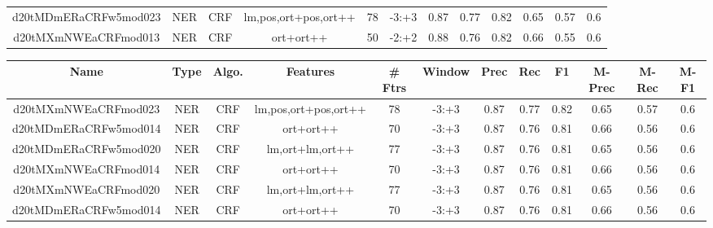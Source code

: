 \documentclass[a4paper]{article}
\begin{document}
\begin{landscape}
\begin{center}
\begin{tabular}{ |c|c|c|c|c|c|c|c|c|c|c|c|}
 
 	
 	\small{ d20tMDmERaCRFw5mod023 } & \small{ NER} & \small{  CRF }  & lm,pos,ort+pos,ort++  &  78 &  \small{  -3:+3 }  &  0.87 & 0.77 & 0.82  &  0.65 & 0.57 & 0.6 \\
 	

 
 	
 	\small{ d20tMXmNWEaCRFmod013 } & \small{ NER} & \small{  CRF }  & ort+ort++  &  50 &  \small{  -2:+2 }  &  0.88 & 0.76 & 0.82  &  0.66 & 0.55 & 0.6 \\
 	
 \hline
\end{tabular}
\end{center}




\begin{center}
\begin{tabular}{ |c|c|c|c|c|c|c|c|c|c|c|c|} 
 \hline
 	Name & Type & Algo. & Features & \# Ftrs & Window & Prec & Rec & F1 & M-Prec & M-Rec & M-F1\\
 \hline

 	

 
 	
 	\small{ d20tMXmNWEaCRFmod023 } & \small{ NER} & \small{  CRF }  & lm,pos,ort+pos,ort++  &  78 &  \small{  -3:+3 }  &  0.87 & 0.77 & 0.82  &  0.65 & 0.57 & 0.6 \\
 	

 
 	
 	\small{ d20tMDmERaCRFw5mod014 } & \small{ NER} & \small{  CRF }  & ort+ort++  &  70 &  \small{  -3:+3 }  &  0.87 & 0.76 & 0.81  &  0.66 & 0.56 & 0.6 \\
 	

 
 	
 	\small{ d20tMDmERaCRFw5mod020 } & \small{ NER} & \small{  CRF }  & lm,ort+lm,ort++  &  77 &  \small{  -3:+3 }  &  0.87 & 0.76 & 0.81  &  0.65 & 0.56 & 0.6 \\
 	

 
 	
 	\small{ d20tMXmNWEaCRFmod014 } & \small{ NER} & \small{  CRF }  & ort+ort++  &  70 &  \small{  -3:+3 }  &  0.87 & 0.76 & 0.81  &  0.66 & 0.56 & 0.6 \\
 	

 
 	
 	\small{ d20tMXmNWEaCRFmod020 } & \small{ NER} & \small{  CRF }  & lm,ort+lm,ort++  &  77 &  \small{  -3:+3 }  &  0.87 & 0.76 & 0.81  &  0.65 & 0.56 & 0.6 \\
 	

 
 	
 	\small{ d20tMDmERaCRFw5mod014 } & \small{ NER} & \small{  CRF }  & ort+ort++  &  70 &  \small{  -3:+3 }  &  0.87 & 0.76 & 0.81  &  0.66 & 0.56 & 0.6 \\
 	


\end{tabular}
\end{center}
\end{landscape}
\end{document}
